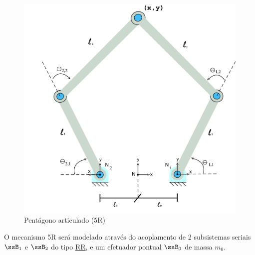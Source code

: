 \documentclass[]{politex}
\begin{document}
\begin{figure}[h]
	\centering
	\includegraphics[scale=0.10]{../figures/5Rscan.jpg}  
	\caption{Pentágono articulado (5R)}
	\label{fig:5R}
\end{figure}

O mecanismo 5R será modelado através do acoplamento de 2 subsistemas seriais $\ssB_1$ e $\ssB_2$ do tipo \underline{R}\underline{R}, e um efetuador pontual $\ssB_0$ de massa $m_0$.
\end{document}
